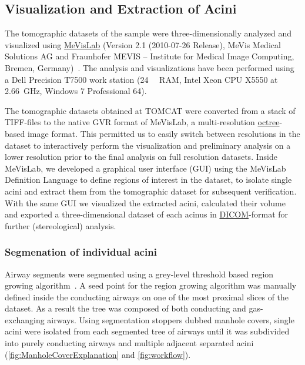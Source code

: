 \documentclass[draft,a4paper,DIVcalc,abstract,english]{scrartcl}
\begin{document}
\subsection{Visualization and Extraction of Acini}
The tomographic datasets of the sample were three-dimensionally analyzed and visualized using \href{http://mevislab.de}{MeVisLab} (Version 2.1 (2010-07-26 Release), MeVis Medical Solutions AG and Fraunhofer MEVIS -- Institute for Medical Image Computing, Bremen, Germany)~\citep{Bitter2007}.
The analysis and visualizations have been performed using a Dell Precision T7500 work station (\SI{24}{\giga\byte} RAM, Intel Xeon CPU X5550 at \SI{2.66}{\giga\hertz}, Windows 7 Professional \SI{64}{\bit}).

The tomographic datasets obtained at TOMCAT were converted from a stack of TIFF-files to the native GVR format of MeVisLab, a multi-resolution \href{https://secure.wikimedia.org/wikipedia/en/w/index.php?title=Octree&oldid=409131920}{octree}-based image format.
This permitted us to easily switch between resolutions in the dataset to interactively perform the visualization and preliminary analysis on a lower resolution prior to the final analysis on full resolution datasets.
Inside MeVisLab, we developed a graphical user interface (GUI) using the MeVisLab Definition Language to define regions of interest in the dataset, to isolate single acini and extract them from the tomographic dataset for subsequent verification.
With the same GUI we visualized the extracted acini, calculated their volume and exported a three-dimensional dataset of each acinus in \href{http://en.wikipedia.org/w/index.php?title=DICOM&oldid=511155074}{DICOM}-format for further (stereological) analysis.

\subsubsection{Segmenation of individual acini}
\label{sec:manhole covers}
Airway segments were segmented using a grey-level threshold based region growing algorithm~\citep{Zucker1976}.
A seed point for the region growing algorithm was manually defined inside the conducting airways on one of the most proximal slices of the dataset.
As a result the tree was composed of both conducting and gas-exchanging airways.
Using segmentation stoppers dubbed manhole covers, single acini were isolated from each segmented tree of airways until it was subdivided into purely conducting airways and multiple adjacent separated acini (\autoref{fig:ManholeCoverExplanation} and \ref{fig:workflow}).
\end{document}
